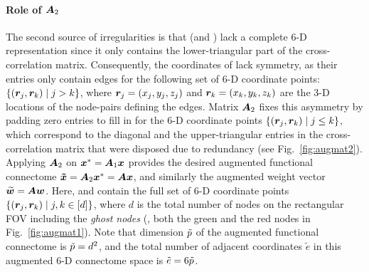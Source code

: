 \paragraph{Role of ${\bm{A}}_2$}
The second source of irregularities is that \x (and \xstar) lack a complete \mbox{$6$-D} representation since it only contains the lower-triangular part of the cross-correlation matrix. 
Consequently, the coordinates of \xstar lack symmetry, as their entries only contain edges for the following set of $6$-D coordinate points: $\left\{({\bm{r}}_j,{\bm{r}}_k) \; |\;  j>k\right\}$, where ${\bm{r}}_j=(x_j,y_j,z_j)$ and ${\bm{r}}_k=(x_k,y_k,z_k)$ are the $3$-D locations of the node-pairs defining the edges.
Matrix ${\bm{A}}_2$ fixes this asymmetry by padding zero entries to fill in for the $6$-D coordinate points $\left\{({\bm{r}}_j,{\bm{r}}_k) \; |\;  j\leq k\right\}$, which correspond to the diagonal and the upper-triangular entries in the cross-correlation matrix that were disposed due to redundancy (see Fig.~\ref{fig:augmat2}).
Applying ${\bm{A}}_2$ on ${\bm{x}}^*={\bm{A}}_1{\bm{x}}$ provides the desired augmented functional connectome ${\bm{\tilde{x}}}={\bm{A}}_2{\bm{x}}^*={\bm{A}}{\bm{x}}$, and similarly the augmented weight vector ${\bm{\widetilde{w}}}={\bm{A}}{\bm{w}}$.
Here, \xtil and \wtil contain the full set of $6$-D coordinate points $\left\{({\bm{r}}_j,{\bm{r}}_k) \; |\;  j,k \in [d]\right\}$, where $d$ is the total number of nodes on the rectangular FOV including the \emph{ghost nodes} (\ie, both the green and the red nodes in Fig.~\ref{fig:augmat1}).
Note that dimension ${\tilde{p}}$ of the augmented functional connectome is ${\tilde{p}}=d^2$, and the total number of adjacent coordinates $\tilde{e}$ in this augmented $6$-D connectome space is $\tilde{e}=6{\tilde{p}}$.

